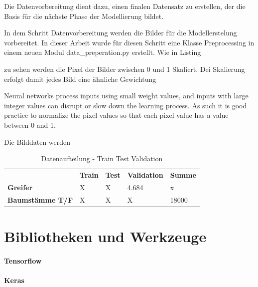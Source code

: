 Die Datenvorbereitung dient dazu, einen finalen Datensatz zu erstellen, der die Basis für die nächste Phase der Modellierung bildet.


			In dem Schritt Datenvorbereitung werden die Bilder für die Modellerstelung vorbereitet. In dieser Arbeit wurde für diesen Schritt eine Klasse Preprocessing in einem neuen Modul data\_preperation.py  erstellt. Wie in Listing 
			
			 zu sehen werden die Pixel der Bilder zwischen 0 und 1 Skaliert. Dei Skalierung erfolgt damit jedes Bild eine ähnliche Gewichtung
			
			Neural networks process inputs using small weight values, and inputs with large integer values can disrupt or slow down the learning process. As such it is good practice to normalize the pixel values so that each pixel value has a value between 0 and 1.
			
			Die Bilddaten werden 		
			

 

	\begin{table}[ht]
	\centering
	\begin{tabularx}{\textwidth}{lllll}
		 & \textbf{Train} & \textbf{Test}  & \textbf{Validation} & \textbf{Summe} 								  \\
		\textbf{Greifer} 				 & 	X					&	X					& 4.684 				   & x 				\\
		\textbf{Baumstämme T/F}	 	  &  X					 &	X					 &	X							& 18000		\\
	\end{tabularx}
	\caption{Datenaufteilung - Train Test Validation}
	\label{table:DatenaufteilungTrainTestValidation}
 	\end{table}
 
	\section{Bibliotheken und Werkzeuge}
	\label{sec:BibliothekenundWerkzeuge}
		\paragraph{Tensorflow}
		\paragraph{Keras}
		
